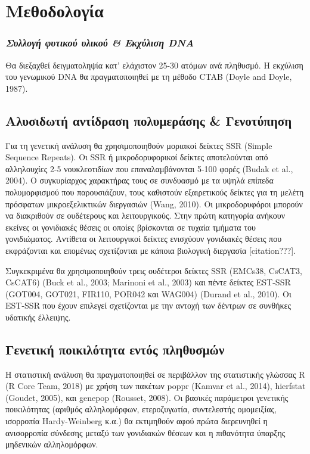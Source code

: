 \documentclass[12pt,a4paper,]{report}
\begin{document}
\section{Μεθοδολογία}

\hypertarget{----dna}{%
\subsubsection{\texorpdfstring{\emph{Συλλογή φυτικού υλικού \& Εκχύλιση
DNA}}{Συλλογή φυτικού υλικού \& Εκχύλιση DNA}}\label{----dna}}

Θα διεξαχθεί δειγματοληψία κατ' ελάχιστον 25-30 ατόμων ανά πληθυσμό. Η
εκχύλιση του γενωμικού DNA θα πραγματοποιηθεί με τη μέθοδο CTAB (Doyle
and Doyle, 1987).

\hypertarget{---}{%
\subsection{Αλυσιδωτή αντίδραση πολυμεράσης \& Γενοτύπηση}\label{---}}

Για τη γενετική ανάλυση θα χρησιμοποιηθούν μοριακοί δείκτες SSR (Simple
Sequence Repeats). Οι SSR ή μικροδορυφορικοί δείκτες αποτελούνται από
αλληλουχίες 2-5 νουκλεοτιδίων που επαναλαμβάνονται 5-100 φορές (Budak et
al., 2004). Ο συγκυρίαρχος χαρακτήρας τους σε συνδυασμό με τα υψηλά
επίπεδα πολυμορφισμού που παρουσιάζουν, τους καθιστούν εξαιρετικούς
δείκτες για τη μελέτη πρόσφατων μικροεξελικτικών διεργασιών (Wang,
2010). Οι μικροδορυφόροι μπορούν να διακριθούν σε ουδέτερους και
λειτουργικούς. Στην πρώτη κατηγορία ανήκουν εκείνες οι γονιδιακές θέσεις
οι οποίες βρίσκονται σε τυχαία τμήματα του γονιδιώματος. Αντίθετα οι
λειτουργικοί δείκτες ενισχύουν γονιδιακές θέσεις που εκφράζονται και
επομένως σχετίζονται με κάποια βιολογική διεργασία {[}citation???{]}.

Συγκεκριμένα θα χρησιμοποιηθούν τρεις ουδέτεροι δείκτες SSR (EMCs38,
CsCAT3, CsCAT6) (Buck et al., 2003; Marinoni et al., 2003) και πέντε
δείκτες EST-SSR (GOT004, GOT021, FIR110, POR042 και WAG004) (Durand et
al., 2010). Οι EST-SSR που έχουν επιλεγεί σχετίζονται με την αντοχή των
δέντρων σε συνθήκες υδατικής έλλειψης.

\hypertarget{---}{%
\subsection{Γενετική ποικιλότητα εντός πληθυσμών}\label{---}}

Η στατιστική ανάλυση θα πραγματοποιηθεί σε περιβάλλον της στατιστικής
γλώσσας R (R Core Team, 2018) με χρήση των πακέτων poppr (Kamvar et al.,
2014), hierfstat (Goudet, 2005), και genepop (Rousset, 2008). Οι βασικές
παράμετροι γενετικής ποικιλότητας (αριθμός αλληλομόρφων, ετεροζυγωτία,
συντελεστής ομομειξίας, ισορροπία Hardy-Weinberg κ.α.) θα εκτιμηθούν
αφού πρώτα διερευνηθεί η ανισορροπία σύνδεσης μεταξύ των γονιδιακών
θέσεων και η πιθανότητα ύπαρξης μηδενικών αλληλομόρφων.
\end{document}

